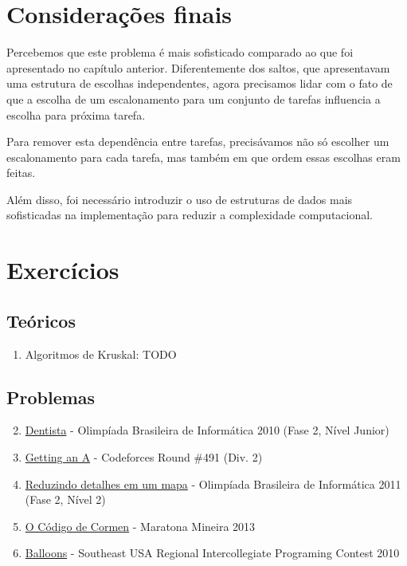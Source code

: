 \section{Considerações finais}

Percebemos que este problema é mais sofisticado comparado ao que foi apresentado no capítulo anterior. Diferentemente dos saltos, que apresentavam uma estrutura de escolhas independentes, agora precisamos lidar com o fato de que a escolha de um escalonamento para um conjunto de tarefas influencia a escolha para próxima tarefa.

Para remover esta dependência entre tarefas, precisávamos não só escolher um escalonamento para cada tarefa, mas também em que ordem essas escolhas eram feitas.

Além disso, foi necessário introduzir o uso de estruturas de dados mais sofisticadas na implementação para reduzir a complexidade computacional.

\section{Exercícios}

\subsection*{Teóricos}

\begin{enumerate}
  \item Algoritmos de Kruskal: TODO
\end{enumerate}

\subsection*{Problemas}

\begin{enumerate}
  \setcounter{enumi}{1}
  \item \href{https://br.spoj.com/problems/JDENTIST/}{Dentista} - Olimpíada Brasileira de Informática 2010 (Fase 2, Nível Junior)
  \item \href{https://codeforces.com/problemset/problem/991/B}{Getting an A} - Codeforces Round \#491 (Div. 2)
  \item \href{https://br.spoj.com/problems/RMAPA11/}{Reduzindo detalhes em um mapa} - Olimpíada Brasileira de Informática 2011 (Fase 2, Nível 2)
  \item \href{https://br.spoj.com/problems/CORMENMG/}{O Código de Cormen} - Maratona Mineira 2013
  \item \href{https://icpcarchive.ecs.baylor.edu/index.php?option=com_onlinejudge&Itemid=8&category=410&page=show_problem&problem=2864}{Balloons} - Southeast USA Regional Intercollegiate Programing Contest 2010
\end{enumerate}